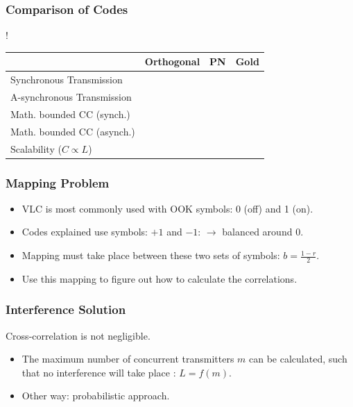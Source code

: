 \documentclass{beamer}
\newcommand{\cmark}{\ding{51}}%
\newcommand{\xmark}{\ding{55}}%
\begin{document}
	\begin{frame}\frametitle{Comparison of Codes}
		

		\begin{table}
			\centering
			\resizebox {\textwidth} {!} {
				\begin{tabular}{ | l | l | l | l | }

					\hline
																	& Orthogonal 	& PN 		& Gold 		\\ \hline
					Synchronous	Transmission						& \cmark		& \cmark	& \cmark	\\ \hline
					A-synchronous Transmission						& \xmark		& \cmark	& \cmark	\\ \hline
					Math. bounded CC (synch.)						& \cmark		& \xmark	& \cmark	\\ \hline
					Math. bounded CC (asynch.)						& \xmark		& \xmark	& \cmark	\\ \hline
					Scalability ($C \propto L$)						& \cmark		& \xmark	& \cmark	\\ \hline		


				\end{tabular}
			}

		\end{table}
	\end{frame}





	\begin{frame}\frametitle{Mapping Problem}

		\begin{itemize}

			\item VLC is most commonly used with OOK symbols: 0 (off) and 1 (on).

			\item Codes explained use symbols: $+1$ and $-1$: $\rightarrow$ balanced around $0$.

			\item Mapping must take place between these two sets of symbols: $b = \frac{1 - r}{2}$.

			\item Use this mapping to figure out how to calculate the correlations.

		\end{itemize}
	\end{frame}



	\begin{frame}\frametitle{Interference Solution}

		Cross-correlation is not negligible.

		\begin{itemize}

			\item The maximum number of concurrent transmitters $m$ can be calculated, such that no interference will take place : $L = f(m)$.

			\item Other way: probabilistic approach.

		\end{itemize}


	\end{frame}
\end{document}
